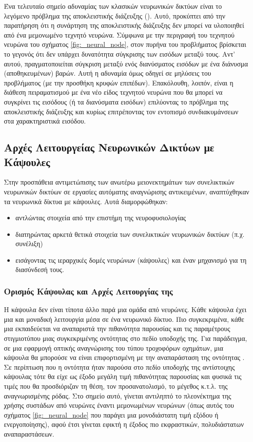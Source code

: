 Ένα τελευταίο σημείο αδυναμίας των κλασικών νευρωνικών δικτύων είναι το λεγόμενο πρόβλημα της αποκλειστικής διάζευξης ()\cite{rumelhart1985learning_internal_representations}. Αυτό, προκύπτει από την παρατήρηση ότι η συνάρτηση της αποκλειστικής διάζευξης δεν μπορεί να υλοποιηθεί από ένα μεμονωμένο τεχνητό νευρώνα. Σύμφωνα με την περιγραφή του τεχνητού νευρώνα του σχήματος \ref{fig:_neural_node}, στον πυρήνα του προβλήματος βρίσκεται το γεγονός ότι δεν υπάρχει δυνατότητα σύγκρισης των εισόδων μεταξύ τους. Αντ' αυτού, πραγματοποιείται σύγκριση μεταξύ ενός διανύσματος εισόδων με ένα διάνυσμα (αποθηκευμένων) βαρών. Αυτή η αδυναμία όμως οδηγεί σε μη λύσεις του προβλήματος (με την προσθήκη κρυφών επιπέδων). Επακόλουθη, λοιπόν, είναι η διάθεση πειραματισμού με ένα νέο είδος τεχνητού νευρώνα που θα μπορεί να συγκρίνει τις εισόδους (ή τα διανύσματα εισόδων) επιλύοντας το πρόβλημα της αποκλειστικής διάζευξης και κυρίως επιτρέποντας τον εντοπισμό συνδιακυμάνσεων στα χαρακτηριστικά εισόδου.


\subsection{Αρχές Λειτουργείας Νευρωνικών Δικτύων με Κάψουλες}
Στην προσπάθεια αντιμετώπισης των ανωτέρω μειονεκτημάτων των συνελικτικών νευρωνικών δικτύων σε εργασίες αυτόματης αναγνώρισης αντικειμένων, αναπτύχθηκαν τα νευρωνικά δίκτυα με κάψουλες. Αυτά διαμορφώθηκαν:
\begin{itemize}
  \item αντλώντας στοιχεία από την επιστήμη της νευροφυσιολογίας
  \item διατηρώντας αρκετά θετικά στοιχεία των συνελικτικών νευρωνικών δικτύων (π.χ. συνέλιξη)
  \item εισάγοντας τις ιεραρχικές δομές νευρώνων (κάψουλες) και έναν μηχανισμό για τη διασύνδεσή τους.
\end{itemize}

\subsubsection{Ορισμός Κάψουλας και Αρχές Λειτουργίας της}
Η κάψουλα δεν είναι τίποτα άλλο παρά μια ομάδα από νευρώνες. Κάθε κάψουλα έχει μια και μοναδική λειτουργία μέσα σε ένα νευρωνικό δίκτυο. Πιο συγκεκριμένα, κάθε μια εκπαιδεύεται να αναπαριστά την πιθανότητα παρουσίας και τις παραμέτρους στιγμιοτύπου μιας συγκεκριμένης οντότητας στο πεδίο υποδοχής της. Για παράδειγμα, σε μια εφαρμογή οπτικής αναγνώρισης του τύπου τροχοφόρων οχημάτων, μια κάψουλα θα μπορούσε να είναι επιφορτισμένη με την αναπαράσταση της οντότητας . Σε περίπτωση που η οντότητα ήταν παρούσα στο πεδίο υποδοχής της αντίστοιχης κάψουλας τότε θα είχε ως έξοδο μεγάλη τιμή πιθανότητας παρουσίας και φυσικά τις τιμές που θα προσδιόριζαν τη θέση, τον προσανατολισμό, το μέγεθος κ.τ.λ. της αναγνωρισμένης ρόδας. Στο σημείο αυτό, γίνεται αντιληπτό το πλεονέκτημα της χρήσης συστάδων από νευρώνες έναντι μεμονωμένων νευρώνων (όπως αυτός του σχήματος \ref{fig:_neural_node} που παράγει μια μονοδιάστατη τιμή εξόδου ή ενεργοποίησης), αφού έτσι γίνεται εφικτή η έξοδος πιο εκφραστικών, πολυδιάστατων αναπαραστάσεων.\par

